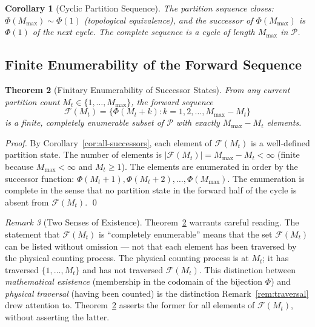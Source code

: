 \documentclass[twocolumn,10pt,a4paper]{article}
\theoremstyle{thmstyle}
\newtheorem{theorem}{Theorem}[section]
\newtheorem{corollary}[theorem]{Corollary}
\theoremstyle{definition}
\theoremstyle{remark}
\newtheorem{remark}[theorem]{Remark}
\newcommand{\Parts}{\mathcal{P}}
\newcommand{\Mmax}{M_{\max}}
\newcommand{\PhiMap}{\varPhi}
\begin{document}
\begin{corollary}[Cyclic Partition Sequence]
\label{cor:cyclic}
The partition sequence closes: $\PhiMap(\Mmax) \sim \PhiMap(1)$ (topological equivalence), and the successor of $\PhiMap(\Mmax)$ is $\PhiMap(1)$ of the next cycle. The complete sequence is a cycle of length $\Mmax$ in $\Parts$.
\end{corollary}

\subsection{Finite Enumerability of the Forward Sequence}

\begin{theorem}[Finitary Enumerability of Successor States]
\label{thm:finite-future}
From any current partition count $M_t \in \{1, \ldots, \Mmax\}$, the forward sequence
\begin{equation}
    \mathcal{F}(M_t) = \{ \PhiMap(M_t + k) : k = 1, 2, \ldots, \Mmax - M_t \}
    \label{eq:finite-future}
\end{equation}
is a finite, completely enumerable subset of $\Parts$ with exactly $\Mmax - M_t$ elements.
\end{theorem}

\begin{proof}
By Corollary~\ref{cor:all-successors}, each element of $\mathcal{F}(M_t)$ is a well-defined partition state. The number of elements is $|\mathcal{F}(M_t)| = \Mmax - M_t < \infty$ (finite because $\Mmax < \infty$ and $M_t \geq 1$). The elements are enumerated in order by the successor function: $\PhiMap(M_t + 1), \PhiMap(M_t + 2), \ldots, \PhiMap(\Mmax)$. The enumeration is complete in the sense that no partition state in the forward half of the cycle is absent from $\mathcal{F}(M_t)$. \qed
\end{proof}

\begin{remark}[Two Senses of Existence]
\label{rem:two-senses}
Theorem~\ref{thm:finite-future} warrants careful reading. The statement that $\mathcal{F}(M_t)$ is ``completely enumerable'' means that the set $\mathcal{F}(M_t)$ can be listed without omission --- not that each element has been traversed by the physical counting process. The physical counting process is at $M_t$; it has traversed $\{1, \ldots, M_t\}$ and has not traversed $\mathcal{F}(M_t)$. This distinction between \emph{mathematical existence} (membership in the codomain of the bijection $\PhiMap$) and \emph{physical traversal} (having been counted) is the distinction Remark~\ref{rem:traversal} drew attention to. Theorem~\ref{thm:finite-future} asserts the former for all elements of $\mathcal{F}(M_t)$, without asserting the latter.
\end{remark}
\end{document}
